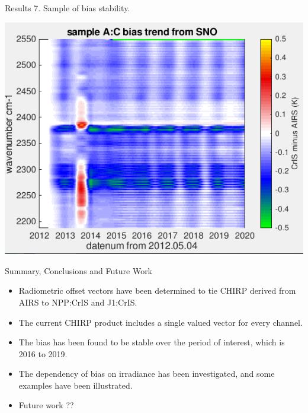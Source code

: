 \documentclass[10pt,t]{beamer}
\begin{document}
\begin{frame}{Results 7. Sample of bias stability.}

  \begin{center}
    \includegraphics[width=0.6\linewidth]{./Figs/plot6.png}
  \end{center}
  
  
\end{frame}

\begin{frame}{Summary, Conclusions and Future Work}

  \begin{itemize}
  \item Radiometric offset vectors have been determined to tie CHIRP derived from AIRS to NPP:CrIS and J1:CrIS.
  \item The current CHIRP product includes a single valued vector for every channel.
  \item The bias has been found to be stable over the period of interest, which is 2016 to 2019.
  \item The dependency of bias on irradiance has been investigated, and some examples have been illustrated.
  \item Future work ??
    
  \end{itemize}
  

\end{frame}


\end{document}

